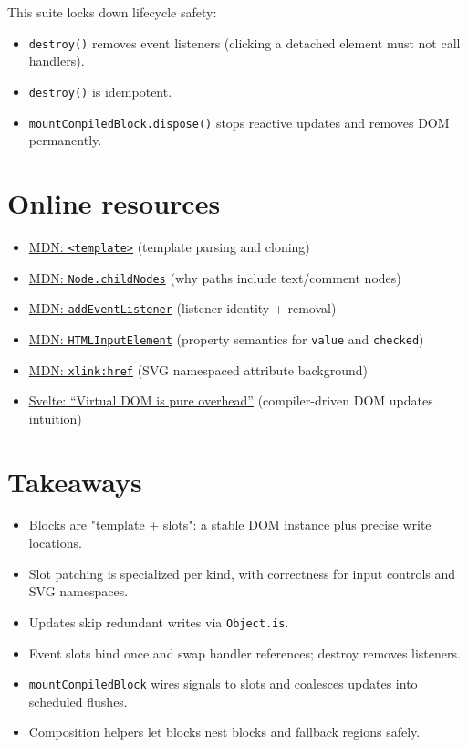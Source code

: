 This suite locks down lifecycle safety:

\begin{itemize}
  \item \texttt{destroy()} removes event listeners (clicking a detached element must not call handlers).
  \item \texttt{destroy()} is idempotent.
  \item \texttt{mountCompiledBlock.dispose()} stops reactive updates and removes DOM permanently.
\end{itemize}

\section{Online resources}

\begin{itemize}
  \item \href{https://developer.mozilla.org/en-US/docs/Web/HTML/Element/template}{MDN: \texttt{<template>}} (template parsing and cloning)
  \item \href{https://developer.mozilla.org/en-US/docs/Web/API/Node/childNodes}{MDN: \texttt{Node.childNodes}} (why paths include text/comment nodes)
  \item \href{https://developer.mozilla.org/en-US/docs/Web/API/EventTarget/addEventListener}{MDN: \texttt{addEventListener}} (listener identity + removal)
  \item \href{https://developer.mozilla.org/en-US/docs/Web/API/HTMLInputElement}{MDN: \texttt{HTMLInputElement}} (property semantics for \texttt{value} and \texttt{checked})
  \item \href{https://developer.mozilla.org/en-US/docs/Web/SVG/Attribute/xlink:href}{MDN: \texttt{xlink:href}} (SVG namespaced attribute background)
  \item \href{https://svelte.dev/blog/virtual-dom-is-pure-overhead}{Svelte: “Virtual DOM is pure overhead”} (compiler-driven DOM updates intuition)
\end{itemize}

\section{Takeaways}

\begin{itemize}
  \item Blocks are "template + slots": a stable DOM instance plus precise write locations.
  \item Slot patching is specialized per kind, with correctness for input controls and SVG namespaces.
  \item Updates skip redundant writes via \texttt{Object.is}.
  \item Event slots bind once and swap handler references; destroy removes listeners.
  \item \texttt{mountCompiledBlock} wires signals to slots and coalesces updates into scheduled flushes.
  \item Composition helpers let blocks nest blocks and fallback regions safely.
\end{itemize}

